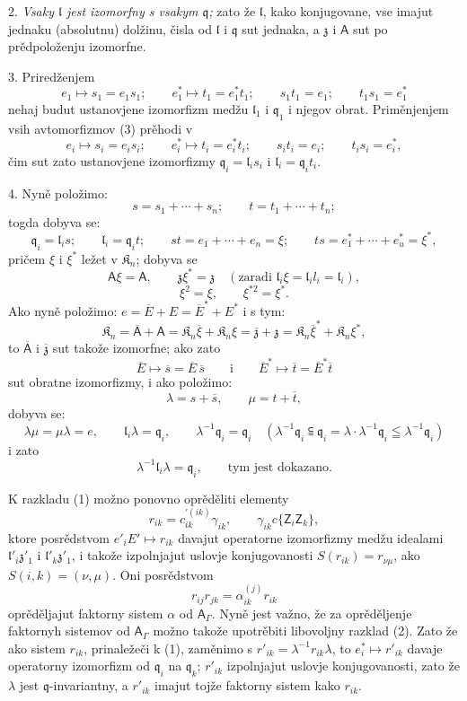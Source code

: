 \documentclass[11pt]{article}
\begin{document}
2. \emph{Vsaky \(\mathfrak l\) jest izomorfny s vsakym \(\mathfrak q\);} zato že \(\mathfrak l\), kako konjugovane, vse imajut jednaku (absolutnu) dolžinu, čisla od \(\mathfrak l\) i \(\mathfrak q\) sut jednaka, a \(\mathfrak z\) i \(\mathsf{A}\) sut po prědpoloženju izomorfne.

3. Priredženjem
\[
\tag{3}
e_1\mapsto s_1=e_1s_1;\qquad
e_1^*\mapsto t_1=e_1^*t_1;\qquad
s_1t_1=e_1;\qquad
t_1s_1=e_1^*
\]
nehaj budut ustanovjene izomorfizm medžu \(\mathfrak l_1\) i \(\mathfrak q_1\) i njegov obrat. Priměnjenjem vsih avtomorfizmov (3) prěhodi v
\[
e_i\mapsto s_i=e_is_i;\qquad
e_i^*\mapsto t_i=e_i^*t_i;\qquad
s_it_i=e_i;\qquad
t_is_i=e_i^*,
\]
čim sut zato ustanovjene izomorfizmy \(\mathfrak q_i=\mathfrak l_is_i\) i \(\mathfrak l_i=\mathfrak q_it_i\).

4. Nyně položimo:
\[
s=s_1+\cdots+s_n;\qquad t=t_1+\cdots+t_n;
\]
togda dobyva se:
\[
\mathfrak q_i=\mathfrak l_is;\qquad
\mathfrak l_i=\mathfrak q_it;\qquad
st=e_1+\cdots+e_n=\xi;\qquad
ts=e_1^*+\cdots+e_u^*=\xi^*,
\]
pričem \(\xi\) i \(\xi^*\) ležet v \(\mathfrak K_n\); dobyva se
\[
\mathsf{A}\xi=\mathsf{A},\qquad \mathfrak z\xi^*=\mathfrak z\quad
(\text{zaradi }\mathfrak l_i\xi=\mathfrak l_il_i=\mathfrak l_i),
\]
\[
\xi^2=\xi,\qquad \xi^{*2}=\xi^*.
\]
Ako nyně položimo: \(e=\overline E+E=\overline E^*+E^*\) i s tym:
\[
\mathfrak K_n=\overline{\mathsf A}+\mathsf{A}
=\mathfrak K_n\overline\xi+\mathfrak K_n\xi
=\overline{\mathfrak z}+\mathfrak z
=\mathfrak K_n\overline\xi^*+\mathfrak K_n\xi^*,
\]
to \(\overline{\mathsf A}\) i \(\overline{\mathfrak z}\) sut takože izomorfne; ako zato
\[
\overline E\mapsto\overline s=\overline E\,\overline s
\qquad\text{i}\qquad
\overline E^*\mapsto\overline t=\overline E^*\overline t
\]
sut obratne izomorfizmy, i ako položimo:
\[
\lambda=s+\overline s,\qquad \mu=t+\overline t,
\]
dobyva se:
\[
\lambda\mu=\mu\lambda=e,\qquad
\mathfrak l_i\lambda=\mathfrak q_i,\qquad
\lambda^{-1}\mathfrak q_i=\mathfrak q_i
\quad
(\lambda^{-1}\mathfrak q_i\subseteqq\mathfrak q_i
=\lambda\cdot\lambda^{-1}\mathfrak q_i\leqq\lambda^{-1}\mathfrak q_i)
\]
i zato
\[
\lambda^{-1}\mathfrak l_i\lambda=\mathfrak q_i,\qquad \text{tym jest dokazano.}
\]

K razkladu (1) možno ponovno oprěděliti elementy
\[
r_{ik}=c_{ik}^{\prime(ik)}\gamma_{ik},\qquad \gamma_{ik}c\{\mathsf{Z}_i\mathsf{Z}_k\},
\]
ktore posrědstvom \(e'_iE'\mapsto r_{ik}\) davajut operatorne izomorfizmy medžu idealami \(\mathfrak l'_i\mathfrak z'_1\) i \(\mathfrak l'_k\mathfrak z'_1\), i takože izpolnjajut uslovje konjugovanosti \(S(r_{ik})=r_{\nu\mu}\), ako \(S(i,k)=(\nu,\mu)\). Oni posrědstvom
\[
r_{ij}r_{jk}=\alpha_{ik}^{(j)}r_{ik}
\]
oprěděljajut faktorny sistem \(\alpha\) od \(\mathsf{A}_\Gamma\). Nyně jest važno, že za oprěděljenje faktornyh sistemov od \(\mathsf{A}_\Gamma\) možno takože upotrěbiti libovoljny razklad (2). Zato že ako sistem \(r_{ik}\), prinaležeči k (1), zaměnimo s \(r'_{ik}=\lambda^{-1}r_{ik}\lambda\), to \(e_i^*\mapsto r'_{ik}\) davaje operatorny izomorfizm od \(\mathfrak q_i\) na \(\mathfrak q_k\); \(r'_{ik}\) izpolnjajut uslovje konjugovanosti, zato že \(\lambda\) jest \(\mathfrak q\)-invariantny, a \(r'_{ik}\) imajut tojže faktorny sistem kako \(r_{ik}\).
\end{document}
